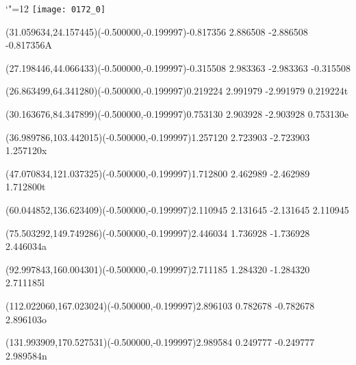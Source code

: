 \documentclass[12pt]{article}
\begin{document}
\makeatletter%
\let\ASYencoding\f@encoding%
\let\ASYfamily\f@family%
\let\ASYseries\f@series%
\let\ASYshape\f@shape%
\makeatother%
{\catcode`"=12%
\texttt{[image: 0172\_0]}%
}%
\kern -315.838131pt%
%
%
\fontsize{12.000000}{14.400000}\selectfont%
\usefont{\ASYencoding}{\ASYfamily}{\ASYseries}{\ASYshape}%
\ASYalignT(31.059634,24.157445)(-0.500000,-0.199997){-0.817356 2.886508 -2.886508 -0.817356}{\vphantom{\strut}A}%
%
%
\fontsize{12.000000}{14.400000}\selectfont%
\ASYalignT(27.198446,44.066433)(-0.500000,-0.199997){-0.315508 2.983363 -2.983363 -0.315508}{\vphantom{\strut} }%
%
%
\fontsize{12.000000}{14.400000}\selectfont%
\ASYalignT(26.863499,64.341280)(-0.500000,-0.199997){0.219224 2.991979 -2.991979 0.219224}{\vphantom{\strut}t}%
%
%
\fontsize{12.000000}{14.400000}\selectfont%
\ASYalignT(30.163676,84.347899)(-0.500000,-0.199997){0.753130 2.903928 -2.903928 0.753130}{\vphantom{\strut}e}%
%
%
\fontsize{12.000000}{14.400000}\selectfont%
\ASYalignT(36.989786,103.442015)(-0.500000,-0.199997){1.257120 2.723903 -2.723903 1.257120}{\vphantom{\strut}x}%
%
%
\fontsize{12.000000}{14.400000}\selectfont%
\ASYalignT(47.070834,121.037325)(-0.500000,-0.199997){1.712800 2.462989 -2.462989 1.712800}{\vphantom{\strut}t}%
%
%
\fontsize{12.000000}{14.400000}\selectfont%
\ASYalignT(60.044852,136.623409)(-0.500000,-0.199997){2.110945 2.131645 -2.131645 2.110945}{\vphantom{\strut} }%
%
%
\fontsize{12.000000}{14.400000}\selectfont%
\ASYalignT(75.503292,149.749286)(-0.500000,-0.199997){2.446034 1.736928 -1.736928 2.446034}{\vphantom{\strut}a}%
%
%
\fontsize{12.000000}{14.400000}\selectfont%
\ASYalignT(92.997843,160.004301)(-0.500000,-0.199997){2.711185 1.284320 -1.284320 2.711185}{\vphantom{\strut}l}%
%
%
\fontsize{12.000000}{14.400000}\selectfont%
\ASYalignT(112.022060,167.023024)(-0.500000,-0.199997){2.896103 0.782678 -0.782678 2.896103}{\vphantom{\strut}o}%
%
%
\fontsize{12.000000}{14.400000}\selectfont%
\ASYalignT(131.993909,170.527531)(-0.500000,-0.199997){2.989584 0.249777 -0.249777 2.989584}{\vphantom{\strut}n}%
%
%
\end{document}
